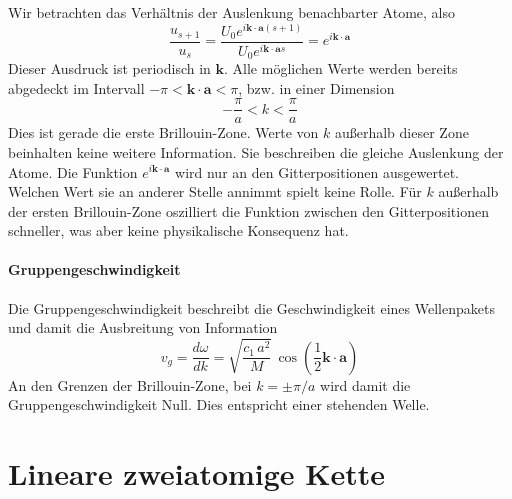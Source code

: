Wir betrachten das Verhältnis der Auslenkung benachbarter Atome, also
\begin{equation}
 \frac{u_{s+1}}{u_s}  = 
 \frac{U_0 e^{i \mathbf{k} \cdot \mathbf{a} (s+1) } } 
        {U_0 e^{i \mathbf{k} \cdot \mathbf{a} s}} 
         = e^{i \mathbf{k} \cdot \mathbf{a}}
\end{equation}
Dieser Ausdruck ist periodisch in $\mathbf{k}$. Alle möglichen Werte werden bereits abgedeckt im Intervall $- \pi < \mathbf{k} \cdot \mathbf{a}  < \pi$, bzw. in einer Dimension 
 \begin{equation}
 - \frac{\pi}{a} < k <  \frac{\pi}{a}
 \end{equation} 
Dies ist gerade die erste Brillouin-Zone. Werte von $k$ außerhalb dieser Zone beinhalten keine weitere Information. Sie beschreiben die gleiche Auslenkung der Atome. Die Funktion  $e^{i \mathbf{k} \cdot \mathbf{a}}$ wird nur an den Gitterpositionen ausgewertet. Welchen Wert sie an anderer Stelle annimmt spielt keine Rolle. Für $k$ außerhalb der ersten Brillouin-Zone oszilliert die Funktion zwischen den Gitterpositionen schneller, was aber keine physikalische Konsequenz hat.



\paragraph{Gruppengeschwindigkeit}
Die Gruppengeschwindigkeit beschreibt die Geschwindigkeit eines Wellenpakets und damit die Ausbreitung von Information
\begin{equation}
v_g = \frac{d \omega}{d k} =
 \sqrt{\frac{c_1 \, a^2}{M} } \, \cos 
 \left( \frac{1}{2} \mathbf{k} \cdot \mathbf{a} \right)
\end{equation}
An den Grenzen der Brillouin-Zone, bei $k = \pm \pi / a$ wird damit die Gruppengeschwindigkeit Null. Dies entspricht einer stehenden Welle.






\section{Lineare zweiatomige Kette}

